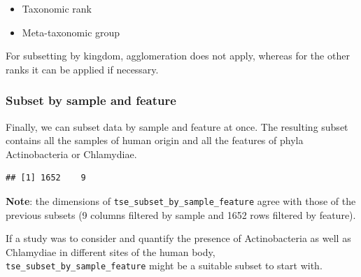 \documentclass[
]{book}
\newenvironment{Shaded}{\begin{snugshade}}{\end{snugshade}}
\newcommand{\CommentTok}[1]{\textcolor[rgb]{0.56,0.35,0.01}{\textit{#1}}}
\newcommand{\FunctionTok}[1]{\textcolor[rgb]{0.00,0.00,0.00}{#1}}
\newcommand{\NormalTok}[1]{#1}
\newcommand{\OtherTok}[1]{\textcolor[rgb]{0.56,0.35,0.01}{#1}}
\newcommand{\SpecialCharTok}[1]{\textcolor[rgb]{0.00,0.00,0.00}{#1}}
\newcommand{\StringTok}[1]{\textcolor[rgb]{0.31,0.60,0.02}{#1}}
\providecommand{\tightlist}{%
  \setlength{\itemsep}{0pt}\setlength{\parskip}{0pt}}
\begin{document}
\begin{itemize}
\tightlist
\item
  Taxonomic rank
\item
  Meta-taxonomic group
\end{itemize}

For subsetting by kingdom, agglomeration does not apply, whereas for
the other ranks it can be applied if necessary.

\hypertarget{subset-by-sample-and-feature}{%
\subsubsection{Subset by sample and feature}\label{subset-by-sample-and-feature}}

Finally, we can subset data by sample and feature at once. The
resulting subset contains all the samples of human origin and all the
features of phyla Actinobacteria or Chlamydiae.

\begin{Shaded}
\end{Shaded}

\begin{verbatim}
## [1] 1652    9
\end{verbatim}

\textbf{Note}: the dimensions of \texttt{tse\_subset\_by\_sample\_feature} agree with
those of the previous subsets (9 columns filtered by sample and 1652
rows filtered by feature).

If a study was to consider and quantify the presence of Actinobacteria
as well as Chlamydiae in different sites of the human body,
\texttt{tse\_subset\_by\_sample\_feature} might be a suitable subset to start
with.
\end{document}
